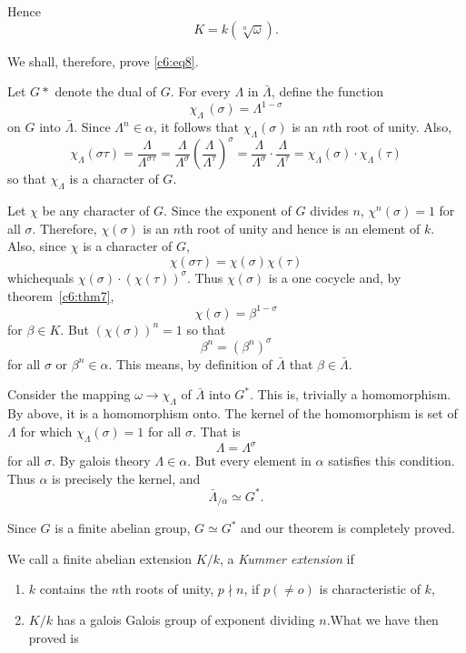 Hence
$$
K= k(\sqrt[n]{\omega}).
$$

We shall, therefore, prove \eqref{c6:eq8}.

Let $G*$ denote the dual of $G$. For every $\Lambda$ in
$\bar{\Lambda}$, define the function 
$$
\chi_{\Lambda} \, (\sigma)= \Lambda^{1 - \sigma}
$$
on $G$ into $\bar{\Lambda}$. Since $\Lambda^n \in \alpha$, it follows
that $\chi_{\Lambda}(\sigma)$ is an $n$th root of unity. Also, 
$$
\chi_{\Lambda}(\sigma \tau) = \frac{\Lambda}{\Lambda^{\sigma
    \tau}}= \frac{\Lambda}{\Lambda^{\sigma
}}  \left(\frac{\Lambda}{\Lambda^{\tau}} \right)^{\sigma}
=\frac{\Lambda}{\Lambda^{\sigma }} \cdot  \frac{\Lambda}{\Lambda^{
    \tau}} =\chi_{\Lambda}(\sigma) \cdot \chi_{\Lambda}( \tau) 
$$
so that $\chi_{\Lambda}$ is a character of $G$.

Let $\chi$ be any character of $G$. Since the exponent of $G$ divides
$n$, $\chi^n(\sigma)=1$ for all $\sigma$. Therefore, $\chi(\sigma)$ is
an $n$th root of unity and hence is an element of $k$. Also, since
$\chi$ is a character of $G$, 
$$
\chi (\sigma \tau) = \chi(\sigma) \chi(\tau)
$$
which\pageoriginale equals $\chi(\sigma)\cdot
(\chi(\tau))^{\sigma}$. Thus $\chi(\sigma)$ is a one cocycle and, by
theorem~\ref{c6:thm7},  
$$
\chi(\sigma)= \beta^{1-\sigma}
$$
for $\beta \in K$. But $(\chi(\sigma))^n=1$ so that 
$$
\beta^n=(\beta^n)^{\sigma}
$$
for all $\sigma$ or $\beta^n \in \alpha$. This means, by definition of
$\bar{\Lambda}$ that $\beta \in \bar{\Lambda}$. 

Consider the mapping $\omega \to \chi_{\Lambda}$ of $\bar{\Lambda}$
into $G^*$. This is, trivially a homomorphism. By above, it is a
homomorphism onto. The kernel of the homomorphism is set of $\Lambda$
for which $\chi_{\Lambda}(\sigma) =1$ for all $\sigma$. That is  
$$
\Lambda =\Lambda ^{\sigma}
$$
for all $\sigma$. By galois theory $\Lambda  \in \alpha$. But every
element in $\alpha$ satisfies this condition. Thus $\alpha$ is
precisely the kernel, and  
$$
\bar{\Lambda }_{/ \alpha} \simeq G^*.
$$

Since $G$ is a finite abelian group, $G \simeq G^*$ and our theorem is
completely proved. 

We call a finite abelian extension $K/k$, a \textit{Kummer extension}
if  
\begin{enumerate}[1)]
\item $k$ contains the $n$th roots of unity, $p \nmid n$, if $p(\neq
  o)$ is characteristic of $k$, 

\item $K/k$ has a galois Galois group of exponent dividing $n$.What
  we have then proved is  
 \end{enumerate}

